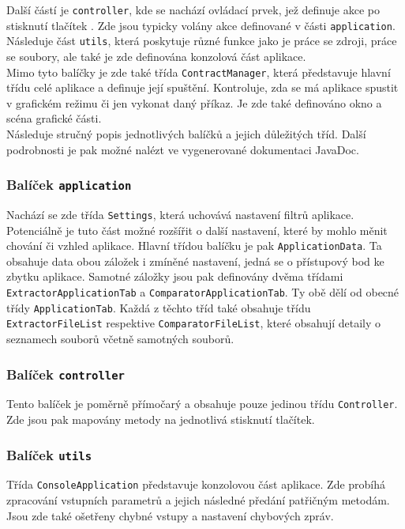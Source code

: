 			Další částí je \texttt{controller}, kde se nachází ovládací prvek, jež definuje akce po stisknutí tlačítek . Zde jsou typicky volány akce definované v části \texttt{application}.\\
			
			Následuje část \texttt{utils}, která poskytuje různé funkce jako je práce se zdroji, práce se soubory, ale také je zde definována konzolová část aplikace.\\
			
			Mimo tyto balíčky je zde také třída \texttt{ContractManager}, která představuje hlavní třídu celé aplikace a definuje její spuštění. Kontroluje, zda se má aplikace spustit v grafickém režimu či jen vykonat daný příkaz. Je zde také definováno okno a scéna grafické části.\\
			
			Následuje stručný popis jednotlivých balíčků a jejich důležitých tříd. Další podrobnosti je pak možné nalézt ve vygenerované dokumentaci JavaDoc.
					 
			
			\subsubsection{Balíček \texttt{application}}
				Nachází se zde třída \texttt{Settings}, která uchovává nastavení filtrů aplikace. Potenciálně je tuto část možné rozšířit o další nastavení, které by mohlo měnit chování či vzhled aplikace. Hlavní třídou balíčku je pak \texttt{ApplicationData}. Ta obsahuje data obou záložek i zmíněné nastavení, jedná se o přístupový bod ke zbytku aplikace. Samotné záložky jsou pak definovány dvěma třídami \texttt{ExtractorApplicationTab} a \texttt{ComparatorApplicationTab}. Ty obě dělí od obecné třídy \texttt{ApplicationTab}. Každá z těchto tříd také obsahuje třídu \texttt{ExtractorFileList} respektive \texttt{ComparatorFileList}, které obsahují detaily o seznamech souborů včetně samotných souborů.
				
			\subsubsection{Balíček \texttt{controller}}
				Tento balíček je poměrně přímočarý a obsahuje pouze jedinou třídu \texttt{Controller}. Zde jsou pak mapovány metody na jednotlivá stisknutí tlačítek.
		
			\subsubsection{Balíček \texttt{utils}}
				Třída \texttt{ConsoleApplication} představuje konzolovou část aplikace. Zde probíhá zpracování vstupních parametrů a jejich následné předání patřičným metodám. Jsou zde také ošetřeny chybné vstupy a nastavení chybových zpráv.\\
				

